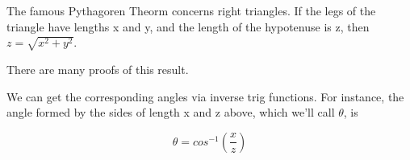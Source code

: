 \documentclass[11pt]{article}  %
\begin{document}

The famous Pythagoren Theorm concerns right triangles.  If the legs of
the triangle have lengths x and y, and the length of the hypotenuse is z,
then $z = \sqrt{x^2+y^2}$.


There are many proofs of this result.

We can get the corresponding angles via inverse trig functions.  For
instance, the angle formed by the sides of length x and z above, which
we'll call $\theta$,   %
is

\begin{equation}
\theta = cos^{-1}(\frac{x}{z})  %
\end{equation}

\end{document}
